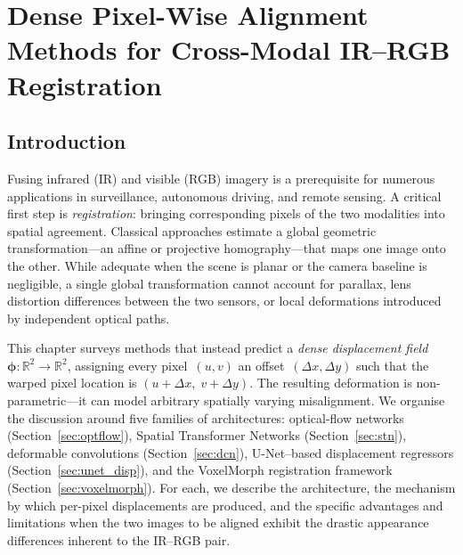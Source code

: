 
\chapter{Dense Pixel-Wise Alignment Methods for Cross-Modal IR--RGB Registration}
\label{ch:dense_alignment}

\section{Introduction}
\label{sec:dense_intro}

Fusing infrared (IR) and visible (RGB) imagery is a prerequisite for
numerous applications in surveillance, autonomous driving, and remote
sensing.  A critical first step is \emph{registration}: bringing
corresponding pixels of the two modalities into spatial agreement.
Classical approaches estimate a global geometric transformation---an
affine or projective homography---that maps one image onto the other.
While adequate when the scene is planar or the camera baseline is
negligible, a single global transformation cannot account for parallax,
lens distortion differences between the two sensors, or local
deformations introduced by independent optical paths.

This chapter surveys methods that instead predict a \emph{dense
displacement field}~$\boldsymbol{\phi}: \mathbb{R}^2 \to \mathbb{R}^2$,
assigning every pixel~$(u,v)$ an offset~$(\Delta x, \Delta y)$ such that
the warped pixel location is $(u + \Delta x,\; v + \Delta y)$.  The
resulting deformation is non-parametric---it can model arbitrary
spatially varying misalignment.  We organise the discussion around five
families of architectures: optical-flow networks
(Section~\ref{sec:optflow}), Spatial Transformer Networks
(Section~\ref{sec:stn}), deformable convolutions
(Section~\ref{sec:dcn}), U-Net--based displacement regressors
(Section~\ref{sec:unet_disp}), and the VoxelMorph registration
framework (Section~\ref{sec:voxelmorph}).  For each, we describe the
architecture, the mechanism by which per-pixel displacements are
produced, and the specific advantages and limitations when the two
images to be aligned exhibit the drastic appearance differences inherent
to the IR--RGB pair.


